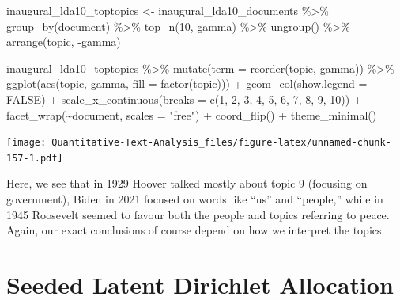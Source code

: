 \documentclass[
]{book}
\newenvironment{Shaded}{\begin{snugshade}}{\end{snugshade}}
\newcommand{\AttributeTok}[1]{\textcolor[rgb]{0.77,0.63,0.00}{#1}}
\newcommand{\ConstantTok}[1]{\textcolor[rgb]{0.00,0.00,0.00}{#1}}
\newcommand{\DecValTok}[1]{\textcolor[rgb]{0.00,0.00,0.81}{#1}}
\newcommand{\FunctionTok}[1]{\textcolor[rgb]{0.00,0.00,0.00}{#1}}
\newcommand{\NormalTok}[1]{#1}
\newcommand{\OtherTok}[1]{\textcolor[rgb]{0.56,0.35,0.01}{#1}}
\newcommand{\SpecialCharTok}[1]{\textcolor[rgb]{0.00,0.00,0.00}{#1}}
\newcommand{\StringTok}[1]{\textcolor[rgb]{0.31,0.60,0.02}{#1}}
\begin{document}
\begin{Shaded}
\begin{Highlighting}[]
\NormalTok{inaugural\_lda10\_toptopics }\OtherTok{\textless{}{-}}\NormalTok{ inaugural\_lda10\_documents }\SpecialCharTok{\%\textgreater{}\%}
    \FunctionTok{group\_by}\NormalTok{(document) }\SpecialCharTok{\%\textgreater{}\%}
    \FunctionTok{top\_n}\NormalTok{(}\DecValTok{10}\NormalTok{, gamma) }\SpecialCharTok{\%\textgreater{}\%}
    \FunctionTok{ungroup}\NormalTok{() }\SpecialCharTok{\%\textgreater{}\%}
    \FunctionTok{arrange}\NormalTok{(topic, }\SpecialCharTok{{-}}\NormalTok{gamma)}

\NormalTok{inaugural\_lda10\_toptopics }\SpecialCharTok{\%\textgreater{}\%}
    \FunctionTok{mutate}\NormalTok{(}\AttributeTok{term =} \FunctionTok{reorder}\NormalTok{(topic, gamma)) }\SpecialCharTok{\%\textgreater{}\%}
    \FunctionTok{ggplot}\NormalTok{(}\FunctionTok{aes}\NormalTok{(topic, gamma, }\AttributeTok{fill =} \FunctionTok{factor}\NormalTok{(topic))) }\SpecialCharTok{+} \FunctionTok{geom\_col}\NormalTok{(}\AttributeTok{show.legend =} \ConstantTok{FALSE}\NormalTok{) }\SpecialCharTok{+}
    \FunctionTok{scale\_x\_continuous}\NormalTok{(}\AttributeTok{breaks =} \FunctionTok{c}\NormalTok{(}\DecValTok{1}\NormalTok{, }\DecValTok{2}\NormalTok{, }\DecValTok{3}\NormalTok{, }\DecValTok{4}\NormalTok{, }\DecValTok{5}\NormalTok{, }\DecValTok{6}\NormalTok{, }\DecValTok{7}\NormalTok{, }\DecValTok{8}\NormalTok{, }\DecValTok{9}\NormalTok{,}
        \DecValTok{10}\NormalTok{)) }\SpecialCharTok{+} \FunctionTok{facet\_wrap}\NormalTok{(}\SpecialCharTok{\textasciitilde{}}\NormalTok{document, }\AttributeTok{scales =} \StringTok{"free"}\NormalTok{) }\SpecialCharTok{+} \FunctionTok{coord\_flip}\NormalTok{() }\SpecialCharTok{+}
    \FunctionTok{theme\_minimal}\NormalTok{()}
\end{Highlighting}
\end{Shaded}

\texttt{[image: Quantitative-Text-Analysis\_files/figure-latex/unnamed-chunk-157-1.pdf]}

Here, we see that in 1929 Hoover talked mostly about topic 9 (focusing on government), Biden in 2021 focused on words like ``us'' and ``people,'' while in 1945 Roosevelt seemed to favour both the people and topics referring to peace. Again, our exact conclusions of course depend on how we interpret the topics.

\hypertarget{seeded-latent-dirichlet-allocation}{%
\section{Seeded Latent Dirichlet Allocation}\label{seeded-latent-dirichlet-allocation}}
\end{document}
